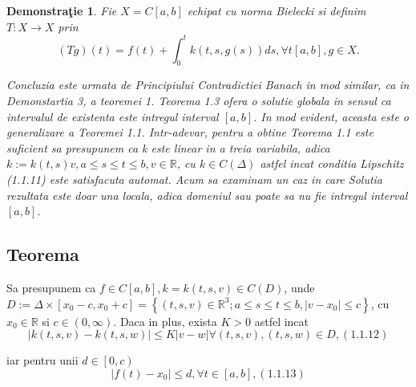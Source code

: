 \documentclass[a4paper,12pt,oneside]{report}
\newtheorem{demonstration}{Demonstra\c tie}
\begin{document}
\begin{demonstration}
					
	Fie \(X = C \left [ a,b \right ]\) echipat cu norma Bielecki si definim \(T : X \rightarrow X\) prin 
	\begin{displaymath}
		\left ( Tg \right )\left ( t \right ) = f\left ( t \right ) + \int_{0}^{t}k\left ( t,s,g\left ( s \right ) \right )ds, \forall t \left [ a,b \right ], g\in X. 
	\end{displaymath}
					
	Concluzia este urmata de Principiului Contradictiei Banach in mod similar, ca in Demonstartia 3, a teoremei 1.
	Teorema 1.3 ofera o solutie globala in sensul ca intervalul de existenta este intregul interval \(\left [ a,b \right ]\). In mod evident, aceasta este o generalizare a Teoremei 1.1. Intr-adevar, pentru a obtine Teorema 1.1 este suficient sa presupunem ca k este linear in a treia variabila, adica \(k:= k\left ( t,s \right )v, a\leq s\leq t\leq b, v\in \mathbb{R}\), cu \(k \in C\left ( \Delta  \right )\) astfel incat conditia Lipschitz (1.1.11) este satisfacuta automat. 
	Acum sa examinam un caz in care Solutia rezultata este doar una locala, adica domeniul sau poate sa nu fie intregul interval \(\left [ a,b \right ]\). 
						
\end{demonstration}

\subsection{Teorema}

Sa presupunem ca \(f\in C\left [ a,b \right ] , k = k\left ( t,s,v \right ) \in C\left ( D \right )\), unde \(D := \Delta \times \left [ x_{0} - c, x_{0} + c \right ] = \left \{ \left ( t,s,v \right ) \in \mathbb{R}^{3} ; a \leq s\leq t\leq b, \left | v - x_{0} \right |\leq c\right \}\), cu \(x_{0} \in \mathbb{R}\) si \(c\in \left ( 0, \infty  \right )\). Daca in plus, exista \(K > 0\) astfel incat
\begin{displaymath}
	\left | k\left ( t,s,v \right ) - k\left ( t,s,w \right )\right | \leq K \left | v - w \right | \forall \left ( t,s,v \right ), \left ( t,s,w \right ) \in D, (1.1.12)
\end{displaymath}

iar pentru unii \(d \in \left [ 0,c \right )\) 
	\begin{displaymath}
		\left | f\left ( t \right ) - x_{0}\right | \leq d, \forall t \in \left [ a,b \right ], (1.1.13)
	\end{displaymath}
					
\end{document}
